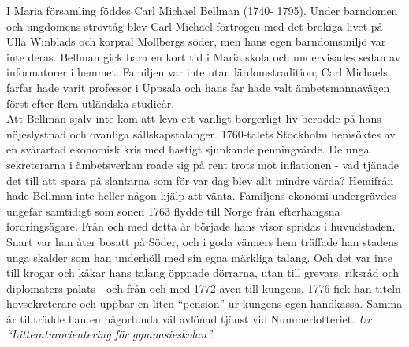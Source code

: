 \vspace{10pt}
\hspace{10pt}I Maria församling föddes Carl Michael Bellman (1740-
1795). Under barndomen och ungdomens strövtåg blev Carl 
Michael förtrogen med det brokiga livet på Ulla Winblads och 
korpral Mollbergs söder, men hans egen barndomsmiljö var inte 
deras. Bellman gick bara en kort tid i Maria skola och 
undervisades sedan av informatorer i hemmet. Familjen var inte 
utan lärdomstradition; Carl Michaels farfar hade varit professor i 
Uppsala och hans far hade valt ämbetsmannavägen först efter 
flera utländska studieår.\\
\indent Att Bellman själv inte kom att leva ett vanligt borgerligt 
liv berodde på hans nöjeslystnad och ovanliga sällskapstalanger. 
1760-talets Stockholm hemsöktes av en svårartad ekonomisk kris 
med hastigt sjunkande penningvärde. De unga sekreterarna i 
ämbetsverkan roade sig på rent trots mot inflationen - vad 
tjänade det till att spara på slantarna som för var dag blev 
allt mindre värda? Hemifrån hade Bellman inte heller någon 
hjälp att vänta. Familjens ekonomi undergrävdes ungefär samtidigt som 
sonen 1763 flydde till Norge från efterhängsna fordringsägare. 
Från och med detta år började hans visor spridas i huvudstaden. 
Snart var han åter bosatt på Söder, och i goda vänners hem 
träffade han stadens unga skalder som han underhöll med sin 
egna märkliga talang. Och det var inte till krogar och kåkar hans 
talang öppnade dörrarna, utan till grevars, riksråd och 
diplomaters palats - och från och med 1772 även till kungens. 
1776 fick han titeln hovsekreterare och uppbar en liten 
``pension'' ur kungens egen handkassa. Samma år tillträdde han en 
någorlunda väl avlönad tjänst vid Nummerlotteriet.
\vspace{10pt}
{\footnotesize\textit{Ur ``Litteraturorientering för gymnasieskolan''.}}
